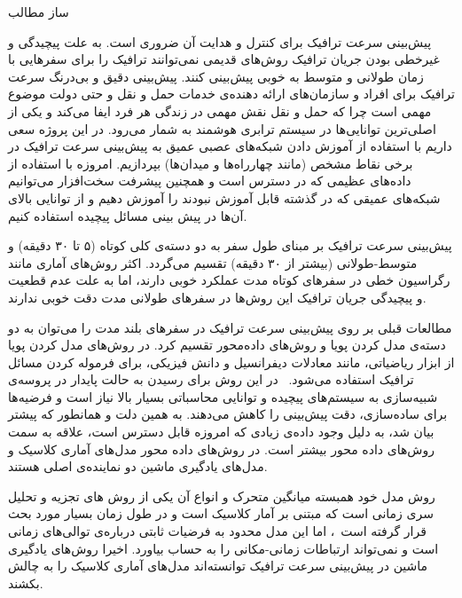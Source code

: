 \documentclass{article}
\begin{document}
\setLTRbibitems{}

‌ساز
‌مطالب

پیش‌بینی سرعت ترافیک برای کنترل و هدایت آن ضروری است.
به علت پیچیدگی و غیرخطی بودن جریان ترافیک روش‌های قدیمی نمی‌توانند ترافیک را برای سفرهایی با زمان طولانی و متوسط به خوبی پیش‌بینی کنند.
پیش‌بینی دقیق و بی‌درنگ سرعت ترافیک برای افراد و سازمان‌های ارائه دهنده‌ی خدمات حمل و نقل و حتی دولت موضوع مهمی است چرا که حمل و نقل نقش مهمی در زندگی هر فرد ایفا می‌کند و یکی از اصلی‌ترین توانایی‌ها در سیستم ترابری هوشمند  به شمار می‌رود.
در این پروژه سعی داریم با استفاده از آموزش دادن شبکه‌های عصبی عمیق به پیش‌بینی سرعت ترافیک در برخی نقاط مشخص (مانند چهارراه‌ها و میدان‌ها) بپردازیم.
امروزه با استفاده از داده‌های عظیمی که در دسترس است و همچنین پیشرفت سخت‌افزار می‌توانیم شبکه‌های عمیقی که در گذشته قابل آموزش نبودند را آموزش دهیم و از توانایی بالای آن‌ها در پیش بینی مسائل پیچیده استفاده کنیم.

پیش‌بینی سرعت ترافیک بر مبنای طول سفر به دو دسته‌ی کلی کوتاه (۵ تا ۳۰ دقیقه) ‌و متوسط-طولانی (بیشتر از ۳۰ دقیقه) تقسیم می‌گردد. اکثر روش‌های آماری مانند رگراسیون خطی در سفرهای کوتاه مدت عملکرد خوبی دارند، اما به علت عدم قطعیت و پیچیدگی جریان ترافیک این روش‌ها در سفرهای طولانی مدت دقت خوبی ندارند.~

مطالعات قبلی بر روی پیش‌بینی سرعت ترافیک در سفرهای بلند مدت را می‌توان به دو دسته‌ی مدل کردن پویا و روش‌های داده‌محور تقسیم کرد.
در روش‌های مدل کردن پویا از ابزار ریاضیاتی، مانند معادلات دیفرانسیل و دانش فیزیکی، برای فرموله کردن مسائل ترافیک استفاده می‌شود.~
در این روش برای رسیدن به حالت پایدار در پروسه‌ی شبیه‌سازی به سیستم‌های پیچیده و توانایی محاسباتی بسیار بالا نیاز است و فرضیه‌ها برای ساده‌سازی، دقت پیش‌بینی را کاهش می‌دهند.
به همین دلت و همانطور که پیشتر بیان شد، به دلیل وجود داده‌ی زیادی که امروزه قابل دسترس است، علاقه به سمت روش‌های داده محور بیشتر است.
در روش‌های داده محور مدل‌های آماری کلاسیک و مدل‌های یادگیری ماشین دو نماینده‌ی اصلی هستند.

روش مدل خود همبسته میانگین متحرک و انواع آن یکی از روش های تجزیه و تحلیل سری زمانی است که مبتنی بر آمار کلاسیک است
و در طول زمان بسیار مورد بحث قرار گرفته است~،
اما این مدل محدود به فرضیات ثابتی درباره‌ی توالی‌های زمانی است و نمی‌تواند ارتباطات زمانی-مکانی را به حساب بیاورد.
اخیرا روش‌های یادگیری ماشین در پیش‌بینی سرعت ترافیک توانسته‌اند مدل‌های آماری کلاسیک را به چالش بکشند.
\end{document}
